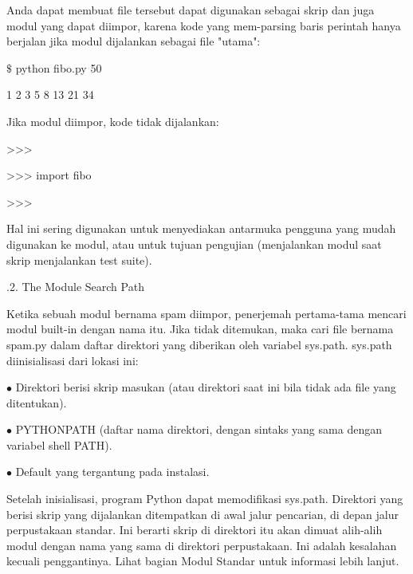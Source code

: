 \vspace{12pt}
\noindent 
Anda dapat membuat file tersebut dapat digunakan sebagai skrip dan juga modul yang dapat diimpor, karena kode yang mem-parsing baris perintah hanya berjalan jika modul dijalankan sebagai file "utama": \par
\vspace{12pt}
\noindent 
 $  \$  $ python fibo.py 50 \par
{} 1 2 3 5 8 13 21 34 \par
\noindent 
Jika modul diimpor, kode tidak dijalankan: \par
\noindent 
>>> \par
\noindent 
>>> import fibo \par
\noindent 
>>> \par
\noindent 
Hal ini sering digunakan untuk menyediakan antarmuka pengguna yang mudah digunakan ke modul, atau untuk tujuan pengujian (menjalankan modul saat skrip menjalankan test suite). \par
\vspace{12pt}
.2. The Module Search Path \par
\noindent 
Ketika sebuah modul bernama spam diimpor, penerjemah pertama-tama mencari modul built-in dengan nama itu. Jika tidak ditemukan, maka cari file bernama spam.py dalam daftar direktori yang diberikan oleh variabel sys.path. sys.path diinisialisasi dari lokasi ini: \par
\vspace{12pt}
\vspace{12pt}
\vspace{12pt}
\noindent 
 $ \bullet $ Direktori berisi skrip masukan (atau direktori saat ini bila tidak ada file yang ditentukan). \par
\noindent 
 $ \bullet $ PYTHONPATH (daftar nama direktori, dengan sintaks yang sama dengan variabel shell PATH). \par
\noindent 
 $ \bullet $ Default yang tergantung pada instalasi. \par
\vspace{12pt}
\noindent 
Setelah inisialisasi, program Python dapat memodifikasi sys.path. Direktori yang berisi skrip yang dijalankan ditempatkan di awal jalur pencarian, di depan jalur perpustakaan standar. Ini berarti skrip di direktori itu akan dimuat alih-alih modul dengan nama yang sama di direktori perpustakaan. Ini adalah kesalahan kecuali penggantinya. Lihat bagian Modul Standar untuk informasi lebih lanjut. \par
